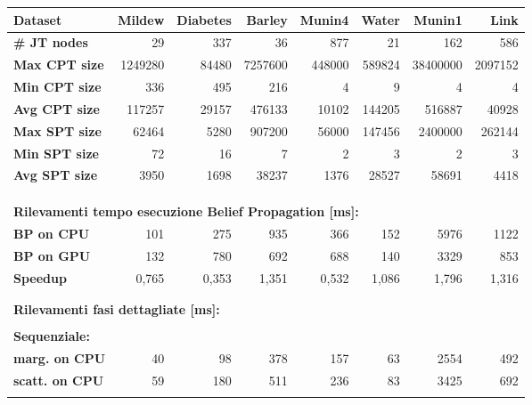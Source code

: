 \documentclass[a4paper]{article}   %
\begin{document}
\begin{table}
\small
\centering
\begin{tabular}{ l | r | r | r | r | r | r | r }
\textbf{Dataset} & \textbf{Mildew} & \textbf{Diabetes} & \textbf{Barley} & \textbf{Munin4} & \textbf{Water} & \textbf{Munin1} & \textbf{Link} \\
  \hline
\textbf{\# JT nodes} & 29 & 337 & 36 &  877 & 21 & 162 & 586 \\
  \hline
\textbf{Max CPT size} & 1249280 & 84480 & 7257600  & 448000 & 589824 & 38400000 & 2097152 \\
\hline
\textbf{Min CPT size} & 336 &	495 &	216 &		4	& 9	&	4	& 4 \\

\hline
\textbf{Avg CPT size} & 117257 &	29157 &	476133 &	10102 &	144205	&	516887 &	40928 \\
  \hline
\textbf{Max SPT size} & 62464	& 5280 &	907200 &		56000 &	147456 &		2400000 &	262144 \\
\hline
\textbf{Min SPT size} & 72	& 16 &	7	&	2 &	3	&	2 &	3 \\
\hline
\textbf{Avg SPT size}  & 3950 &	1698	& 38237	&	1376	& 28527 &		58691 &	4418 \\
 \\
\multicolumn{8}{l}{ }	\\
\multicolumn{8}{l}{ }	\\								

\multicolumn{8}{l}{ \textbf{Rilevamenti tempo esecuzione Belief Propagation [ms]:}}	\\		
\hline
\textbf{BP on CPU} & 101 &	275 &	935	&	366 &	152	&	5976 &	1122 \\
\hline
\textbf{BP on GPU} & 132 &	780 &	692	&		688 &	140	&	3329 &	853 \\
\hline
\textbf{Speedup} & 0,765 &	0,353 &	1,351	&	0,532 &	1,086	&	1,796 &	1,316 \\
\multicolumn{8}{l}{ }	\\	
\multicolumn{8}{l}{ }	\\								

\multicolumn{8}{l}{\textbf{Rilevamenti fasi dettagliate [ms]:}} \\
\multicolumn{8}{l}{ }	\\								
\multicolumn{8}{l}{\textbf{Sequenziale:}} \\
\hline
\textbf{marg. on CPU} &	40 & 	98 &	378 &		157 &	63	&	2554 &	492 \\
\hline
\textbf{scatt. on CPU} &	59 &	180 &	511	 &		236 &	83 &		3425 &	692 \\
\multicolumn{8}{l}{ }	\\								


\end{tabular}
\end{table}
\end{document}
